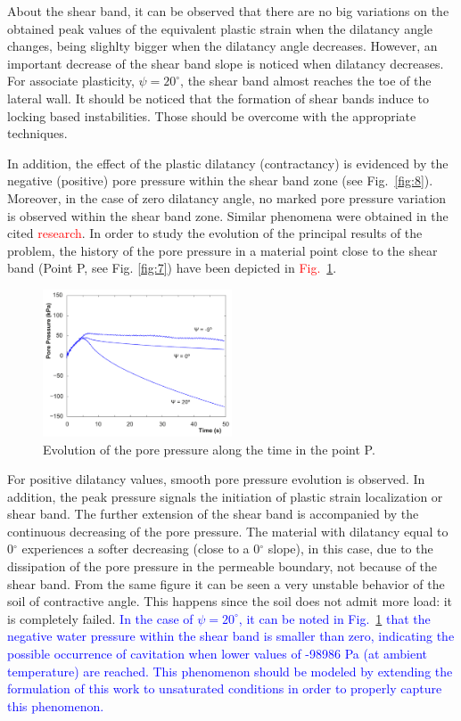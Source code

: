 \documentclass[twocolumn]{svjour3}          %
\begin{document}
About the shear band, it can be observed that there are no big  variations on  the obtained peak values of the equivalent plastic strain when the dilatancy angle changes, being slighlty bigger when the dilatancy angle decreases. However, an important decrease of the shear band slope is noticed when dilatancy decreases. For associate plasticity, $\psi=20^\circ$, the shear band almost reaches the toe of the lateral wall. It should be noticed that the formation of shear bands induce to locking based instabilities. Those should be overcome with the appropriate techniques.

In addition, the effect of the plastic dilatancy (contractancy) is evidenced by the negative (positive) pore pressure within the shear band zone (see Fig.~\ref{fig:8}).  Moreover, in the case of zero dilatancy angle, no marked pore pressure variation is observed within the shear band zone. Similar phenomena were obtained in the cited \textcolor{red}{research}. In order to study the evolution of the principal results of the problem, the history of the pore pressure  in a material point close to the shear band (Point P, see Fig. \ref{fig:7}) have been depicted in  \textcolor{red}{Fig.}~\ref{fig:13}.

\begin{figure}
  \includegraphics[width=0.5\textwidth]{Fig/pressure.pdf}
\caption{Evolution of the pore pressure along the time in the point P.}
\label{fig:13}      
\end{figure}

For positive dilatancy values, smooth pore pressure evolution is observed. In addition, the peak pressure signals the initiation of plastic strain localization or shear band. The further extension of the shear band is accompanied by the continuous decreasing of the pore pressure. The material with dilatancy equal to 0$^\circ$ experiences a softer decreasing (close to a 0$^\circ$ slope), in this case, due to the dissipation of the pore pressure in the permeable boundary, not because of the shear band. From the same figure it can be seen a very unstable behavior of the soil of contractive angle. This happens since the soil does not admit more load: it is completely failed. \textcolor{blue}{In the case of $\psi=20^\circ$, it can be noted in Fig.~\ref{fig:13}  that the negative water pressure within the shear band is smaller than zero, indicating the possible occurrence of cavitation when lower values of -98986 Pa (at ambient temperature) are reached. This phenomenon should be modeled by extending the formulation of this work to unsaturated conditions in order to properly capture this phenomenon.}
\end{document}
